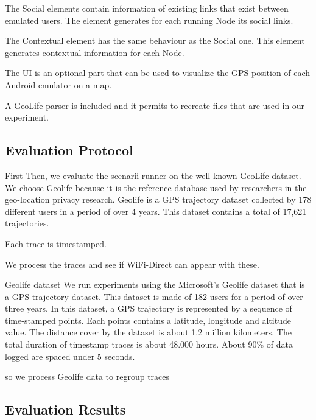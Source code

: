 The Social elements contain information of existing links that exist between emulated users.
The element generates for each running Node its social links.

The Contextual element has the same behaviour as the Social one.
This element generates contextual information for each Node.

The UI is an optional part that can be used to visualize the GPS position of each Android emulator on a map.

A GeoLife parser is included and it permits to recreate files that are used in our experiment.

\subsection{Evaluation Protocol}


First
Then, we evaluate the scenarii runner on the well known GeoLife dataset.
We choose Geolife because it is the reference database used by researchers in the geo-location privacy research.
Geolife is a GPS trajectory dataset collected by 178 different users in a period of over 4 years. 
This dataset contains a total of 17,621 trajectories.

Each trace is timestamped.

We process the traces and see if WiFi-Direct can appear with these.

Geolife dataset
We run experiments using the Microsoft’s Geolife
dataset that is a GPS trajectory dataset.
This dataset is made of 182 users for a period of over three years.
In this dataset, a GPS trajectory is represented by a
sequence of time-stamped points.
Each points contains a latitude, longitude and altitude value.
The distance cover by the dataset is about 1.2 million kilometers.
The total duration of timestamp traces is about 48.000 hours.
About 90\% of data logged are spaced under 5 seconds.


so we process Geolife data to regroup traces 

\subsection{Evaluation Results}